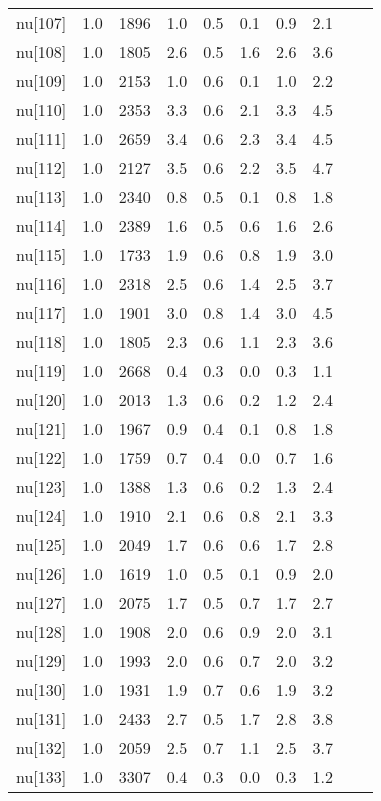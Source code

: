 \begin{longtable}{lrrrrrrr p{} | p{} |}
  nu[107] & 1.0 & 1896 & 1.0 & 0.5 & 0.1 & 0.9 & 2.1 \\ 
  nu[108] & 1.0 & 1805 & 2.6 & 0.5 & 1.6 & 2.6 & 3.6 \\ 
  nu[109] & 1.0 & 2153 & 1.0 & 0.6 & 0.1 & 1.0 & 2.2 \\ 
  nu[110] & 1.0 & 2353 & 3.3 & 0.6 & 2.1 & 3.3 & 4.5 \\ 
  nu[111] & 1.0 & 2659 & 3.4 & 0.6 & 2.3 & 3.4 & 4.5 \\ 
  nu[112] & 1.0 & 2127 & 3.5 & 0.6 & 2.2 & 3.5 & 4.7 \\ 
  nu[113] & 1.0 & 2340 & 0.8 & 0.5 & 0.1 & 0.8 & 1.8 \\ 
  nu[114] & 1.0 & 2389 & 1.6 & 0.5 & 0.6 & 1.6 & 2.6 \\ 
  nu[115] & 1.0 & 1733 & 1.9 & 0.6 & 0.8 & 1.9 & 3.0 \\ 
  nu[116] & 1.0 & 2318 & 2.5 & 0.6 & 1.4 & 2.5 & 3.7 \\ 
  nu[117] & 1.0 & 1901 & 3.0 & 0.8 & 1.4 & 3.0 & 4.5 \\ 
  nu[118] & 1.0 & 1805 & 2.3 & 0.6 & 1.1 & 2.3 & 3.6 \\ 
  nu[119] & 1.0 & 2668 & 0.4 & 0.3 & 0.0 & 0.3 & 1.1 \\ 
  nu[120] & 1.0 & 2013 & 1.3 & 0.6 & 0.2 & 1.2 & 2.4 \\ 
  nu[121] & 1.0 & 1967 & 0.9 & 0.4 & 0.1 & 0.8 & 1.8 \\ 
  nu[122] & 1.0 & 1759 & 0.7 & 0.4 & 0.0 & 0.7 & 1.6 \\ 
  nu[123] & 1.0 & 1388 & 1.3 & 0.6 & 0.2 & 1.3 & 2.4 \\ 
  nu[124] & 1.0 & 1910 & 2.1 & 0.6 & 0.8 & 2.1 & 3.3 \\ 
  nu[125] & 1.0 & 2049 & 1.7 & 0.6 & 0.6 & 1.7 & 2.8 \\ 
  nu[126] & 1.0 & 1619 & 1.0 & 0.5 & 0.1 & 0.9 & 2.0 \\ 
  nu[127] & 1.0 & 2075 & 1.7 & 0.5 & 0.7 & 1.7 & 2.7 \\ 
  nu[128] & 1.0 & 1908 & 2.0 & 0.6 & 0.9 & 2.0 & 3.1 \\ 
  nu[129] & 1.0 & 1993 & 2.0 & 0.6 & 0.7 & 2.0 & 3.2 \\ 
  nu[130] & 1.0 & 1931 & 1.9 & 0.7 & 0.6 & 1.9 & 3.2 \\ 
  nu[131] & 1.0 & 2433 & 2.7 & 0.5 & 1.7 & 2.8 & 3.8 \\ 
  nu[132] & 1.0 & 2059 & 2.5 & 0.7 & 1.1 & 2.5 & 3.7 \\ 
  nu[133] & 1.0 & 3307 & 0.4 & 0.3 & 0.0 & 0.3 & 1.2 \\ 

\end{longtable}
